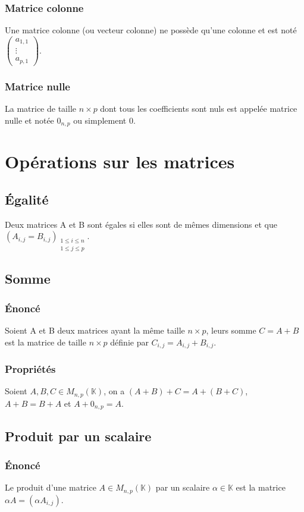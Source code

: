 \documentclass[a4paper,10pt]{book} %
\newcommand{\K}{\mathbb{K}}
\begin{document}
\subsubsection{Matrice colonne}
Une matrice colonne (ou vecteur colonne) ne possède qu'une colonne et est noté $\begin{pmatrix}
a_{1,1} \\
\vdots\\
a_{p,1} \end{pmatrix}$.

\subsubsection{Matrice nulle}
La matrice de taille $n\times p$ dont tous les coefficients sont nuls est appelée matrice nulle et notée $0_{n,p}$ ou simplement 0.

\section{Opérations sur les matrices}
\subsection{Égalité}
Deux matrices A et B sont égales si elles sont de mêmes dimensions et que $(A_{i,j}=B_{i,j})_{\substack{1\leq i\leq n \\ 1\leq j\leq p}}$.

\subsection{Somme}
\subsubsection{Énoncé}
Soient A et B deux matrices ayant la même taille $n\times p$, leurs somme $C=A+B$ est la matrice de taille $n\times p$ définie par $C_{i,j}=A_{i,j}+B_{i,j}$.

\subsubsection{Propriétés}
Soient $A,B,C \in M_{n,p}(\K)$, on a $(A+B)+C=A+(B+C)$, $A+B=B+A$ et $A+0_{n,p}=A$.

\subsection{Produit par un scalaire}
\subsubsection{Énoncé}
Le produit d'une matrice $A\in M_{n,p}(\K)$ par un scalaire $\alpha \in \K$ est la matrice $\alpha A=(\alpha A_{i,j})$.
\end{document}
